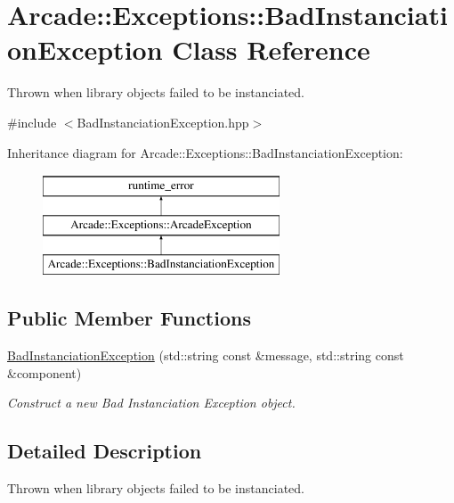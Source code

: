 \hypertarget{classArcade_1_1Exceptions_1_1BadInstanciationException}{}\section{Arcade\+::Exceptions\+::Bad\+Instanciation\+Exception Class Reference}
\label{classArcade_1_1Exceptions_1_1BadInstanciationException}


Thrown when library objects failed to be instanciated.  




{\ttfamily \#include $<$Bad\+Instanciation\+Exception.\+hpp$>$}

Inheritance diagram for Arcade\+::Exceptions\+::Bad\+Instanciation\+Exception\+:\begin{figure}[H]
\begin{center}
\leavevmode
\includegraphics[height=3.000000cm]{classArcade_1_1Exceptions_1_1BadInstanciationException}
\end{center}
\end{figure}
\subsection*{Public Member Functions}
\begin{DoxyCompactItemize}
\item 
\mbox{\hyperlink{classArcade_1_1Exceptions_1_1BadInstanciationException_af23ea9690c2d1ebf5b90bdb30561dd3b}{Bad\+Instanciation\+Exception}} (std\+::string const \&message, std\+::string const \&component)
\begin{DoxyCompactList}\small\item\em Construct a new Bad Instanciation Exception object. \end{DoxyCompactList}\end{DoxyCompactItemize}


\subsection{Detailed Description}
Thrown when library objects failed to be instanciated. 

